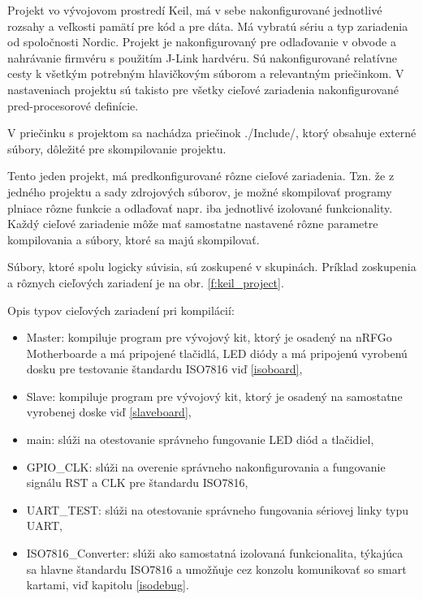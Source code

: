 \documentclass[12pt,a4paper,oneside,openright]{report}
\begin{document}
	Projekt vo vývojovom prostredí Keil, má v sebe nakonfigurované jednotlivé rozsahy a veľkosti pamätí pre kód a pre dáta. Má vybratú sériu a typ zariadenia od spoločnosti Nordic. Projekt je nakonfigurovaný pre odlaďovanie v obvode a nahrávanie firmvéru s použitím J-Link hardvéru.
	Sú nakonfigurované relatívne cesty k všetkým potrebným hlavičkovým súborom a relevantným priečinkom. V nastaveniach projektu sú takisto pre všetky cieľové zariadenia nakonfigurované pred-procesorové definície.
	
	V priečinku s projektom sa nachádza priečinok ./Include/, ktorý obsahuje externé súbory, dôležité pre skompilovanie projektu.
	
	Tento jeden projekt, má predkonfigurované rôzne cieľové zariadenia. Tzn. že z jedného projektu a sady zdrojových súborov, je možné skompilovať programy plniace rôzne funkcie a odlaďovať napr. iba jednotlivé izolované funkcionality. 
	Každý cieľové zariadenie môže mať samostatne nastavené rôzne parametre kompilovania a súbory, ktoré sa majú skompilovať.

	
	Súbory, ktoré spolu logicky súvisia, sú zoskupené v skupinách. Príklad zoskupenia a rôznych cieľových zariadení je na obr. \ref{f:keil_project}.
	
	Opis typov cieľových zariadení pri kompilácií:
		\singlespacing
	\begin{itemize}
		\item Master: kompiluje program pre vývojový kit, ktorý je osadený na nRFGo Motherboarde a má pripojené tlačidlá, LED diódy a má pripojenú vyrobenú dosku pre testovanie štandardu ISO7816 viď \ref{isoboard},
		\item Slave: kompiluje program pre vývojový kit, ktorý je osadený na samostatne vyrobenej doske viď \ref{slaveboard},
		\item main: slúži na otestovanie správneho fungovanie LED diód a tlačidiel,
		\item GPIO\_CLK: slúži na overenie správneho nakonfigurovania a fungovanie signálu RST a CLK pre štandardu ISO7816,
		\item UART\_TEST: slúži na otestovanie správneho fungovania sériovej linky typu UART,
		\item ISO7816\_Converter: slúži ako samostatná izolovaná funkcionalita, týkajúca sa hlavne štandardu ISO7816 a umožňuje cez konzolu komunikovať so smart kartami, viď kapitolu \ref{isodebug}.
	\end{itemize}
		\onehalfspacing
	
\end{document}
